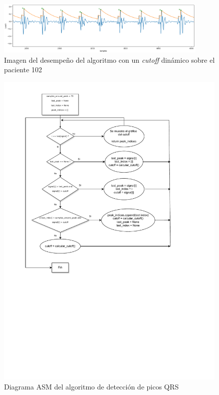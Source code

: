 \begin{figure}[h!]
    \centering
    \includegraphics[width=0.9\textwidth]{./Images/img_algoritmo/cutoffdinamico.png}
    \caption[Imagen de \textit{cutoff} dinámico]{Imagen del desempeño del algoritmo con un \textit{cutoff} dinámico sobre el paciente 102}
    \label{fig:cutoffdinamico}
\end{figure}

\begin{figure}[h!]
	\centering
    \includegraphics[width=0.99\textwidth]{./Images/img_algoritmo/Diagramapicos.pdf}
    \caption{Diagrama ASM del algoritmo de detección de picos QRS}
    \label{fig:diagramapicos}
\end{figure} 

